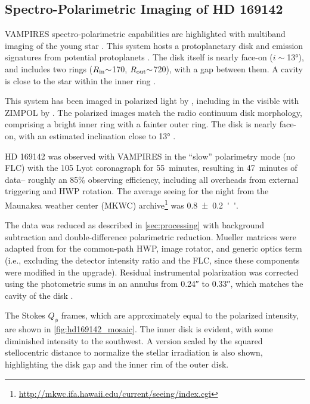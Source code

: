 \subsection{Spectro-Polarimetric Imaging of HD 169142\label{sec:hd169142}}

VAMPIRES spectro-polarimetric capabilities are highlighted with multiband imaging of the young star . This system hosts a protoplanetary disk \citep{quanz_gaps_2013} and emission signatures from potential protoplanets \citep{hammond_confirmation_2023}. The disk itself is nearly face-on ($i{\sim}$\ang{13}), and includes two rings ($R_{\rm in}{\sim}$\SI{170}{\mas}, $R_{\rm out}{\sim}$\SI{720}{\mas}), with a gap between them. A cavity is close to the star within the inner ring \citep{fedele_alma_2017}.

This system has been imaged in polarized light by \citet{kuhn_imaging_2001,quanz_gaps_2013,monnier_polarized_2017,pohl_circumstellar_2017}, including in the visible with ZIMPOL by \citet{bertrang_hd_2018}. The polarized images match the radio continuum disk morphology, comprising a bright inner ring with a fainter outer ring. The disk is nearly face-on, with an estimated inclination close to \ang{13} \citep{fedele_alma_2017}.

HD 169142 was observed with VAMPIRES in the ``slow'' polarimetry mode (no FLC) with the \SI{105}{\mas} Lyot coronagraph for \SI{55}{minutes}, resulting in \SI{47}{minutes} of data-- roughly an 85\% observing efficiency, including all overheads from external triggering and HWP rotation. The average seeing for the night from the Maunakea weather center (MKWC) archive\footnote{\url{http://mkwc.ifa.hawaii.edu/current/seeing/index.cgi}} was \SI{0.8\pm0.2}{''}.

The data was reduced as described in \autoref{sec:processing} with background subtraction and double-difference polarimetric reduction. Mueller matrices were adapted from \citet{zhang_characterizing_2023} for the common-path HWP, image rotator, and generic optics term (i.e., excluding the detector intensity ratio and the FLC, since these components were modified in the upgrade). Residual instrumental polarization was corrected using the photometric sums in an annulus from \ang{;;0.24} to \ang{;;0.33}, which matches the cavity of the disk \citep{bertrang_hd_2018}.

The Stokes $Q_\phi$ frames, which are approximately equal to the polarized intensity, are shown in \autoref{fig:hd169142_mosaic}. The inner disk is evident, with some diminished intensity to the southwest. A version scaled by the squared stellocentric distance to normalize the stellar irradiation is also shown, highlighting the disk gap and the inner rim of the outer disk.

